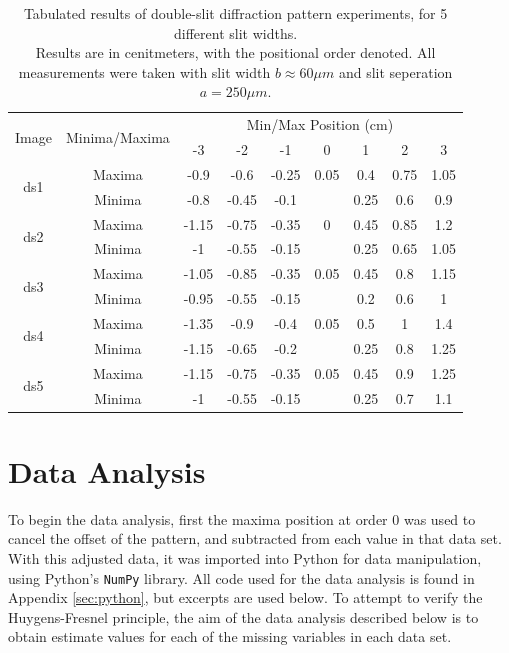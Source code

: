 \documentclass[a4paper]{article}
\begin{document}
\begin{table}[h!]
  \centering
  \begin{tabular}{|c|c|ccccccc|}\hline
    \multirow{2}{*}{Image} & \multirow{2}{*}{Minima/Maxima} & \multicolumn{7}{c|}{Min/Max Position (cm)}               \\
    &          & -3    & -2    & -1    & 0    & 1    & 2    & 3      \\\hline\hline
  \multirow{2}{*}{ds1} & Maxima  & -0.9  & -0.6  & -0.25 & 0.05 & 0.4  & 0.75 & 1.05 \\
                       & Minima  & -0.8  & -0.45 & -0.1  &      & 0.25 & 0.6  & 0.9  \\\hline
  \multirow{2}{*}{ds2} & Maxima  & -1.15 & -0.75 & -0.35 & 0    & 0.45 & 0.85 & 1.2  \\
                       & Minima  & -1    & -0.55 & -0.15 &      & 0.25 & 0.65 & 1.05 \\\hline
  \multirow{2}{*}{ds3} & Maxima  & -1.05 & -0.85 & -0.35 & 0.05 & 0.45 & 0.8  & 1.15 \\
                       & Minima  & -0.95 & -0.55 & -0.15 &      & 0.2  & 0.6  & 1    \\\hline
  \multirow{2}{*}{ds4} & Maxima  & -1.35 & -0.9  & -0.4  & 0.05 & 0.5  & 1    & 1.4  \\
                       & Minima  & -1.15 & -0.65 & -0.2  &      & 0.25 & 0.8  & 1.25 \\\hline
  \multirow{2}{*}{ds5} & Maxima  & -1.15 & -0.75 & -0.35 & 0.05 & 0.45 & 0.9  & 1.25 \\
                       & Minima  & -1    & -0.55 & -0.15 &      & 0.25 & 0.7  & 1.1 \\\hline
  \end{tabular}
  \captionsetup{justification=centering}
  \caption{\label{tab:ds_tab}Tabulated results of double-slit diffraction pattern experiments, for 5 different slit widths.\\ Results are in cenitmeters, with the positional order denoted. All measurements were taken with slit width $b\approx 60\mu m$ and slit seperation $a=250\mu m$.}
\end{table}


\section{Data Analysis}

To begin the data analysis, first the maxima position at order 0 was used to cancel the offset of the pattern, and subtracted from each value in that data set. With this adjusted data, it was imported into Python for data manipulation, using Python's \lstinline$NumPy$ library. All code used for the data analysis is found in Appendix \ref{sec:python}, but excerpts are used below. To attempt to verify the Huygens-Fresnel principle, the aim of the data analysis described below is to obtain estimate values for each of the missing variables in each data set.
\end{document}
